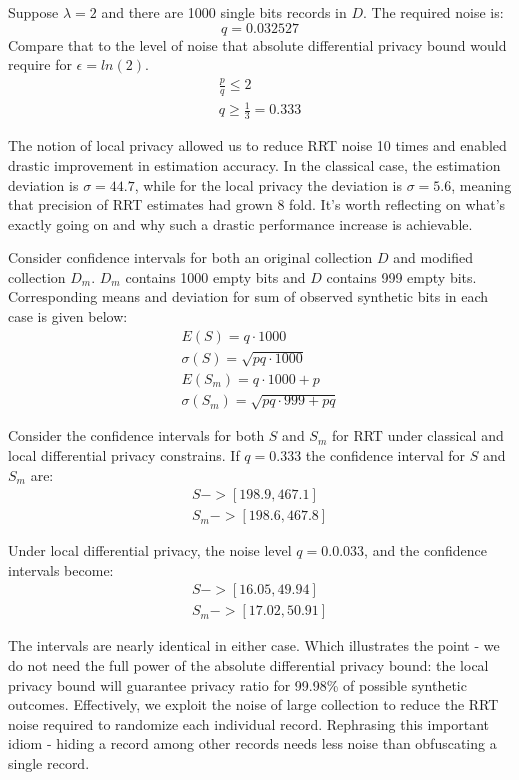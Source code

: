 \documentclass[11pt,draft]{article}
\begin{document}
Suppose  $\lambda=2$ and there are 1000 single bits records in $D$.  The required noise is:
\[
q = 0.032527
\]
Compare that to the level of noise that absolute differential privacy bound would require for $\epsilon=ln(2)$. 
\begin{align}
\frac{p}{q} \le 2 \\
q \ge \frac{1}{3} =  0.333
\end{align}

The notion of local privacy allowed us to reduce RRT noise 10 times and enabled drastic improvement in estimation accuracy.  In the classical case, the estimation deviation is $\sigma =  44.7$, while for the local privacy the deviation is $\sigma =  5.6$, meaning that precision of RRT estimates had grown 8 fold.  It's worth reflecting on what's  exactly going on and why such a drastic performance increase is achievable. 

Consider confidence intervals for both an original collection $D$  and modified collection $D_m$.  $D_m$ contains 1000 empty bits and $D$ contains 999 empty bits.  Corresponding means and deviation for sum of observed synthetic bits in each case is given below:
\begin{align}
E(S) = q \cdot 1000 \\
\sigma(S) = \sqrt{pq\cdot 1000} \\
E(S_m) = q \cdot 1000 + p  \\
\sigma(S_m) = \sqrt{pq\cdot 999 + pq}
\end{align}

Consider the confidence intervals for both $S$ and $S_m$ for RRT under classical and local differential privacy constrains.  If $q=0.333$ the confidence interval for $S$ and $S_m$  are:
\begin{align}
S -> [198.9 , 467.1] \\
S_m -> [198.6 , 467.8]
\end{align}

Under local differential privacy, the noise level $q= 0. 0.033$, and the confidence intervals become:
\begin{align}
S -> [16.05 , 49.94] \\
S_m -> [ 17.02 , 50.91]
\end{align}

The intervals are nearly identical in either case.  Which illustrates the point - we do not need the full power of the absolute differential privacy bound: the local privacy bound will guarantee privacy ratio for 99.98\% of possible synthetic outcomes.  Effectively, we exploit the noise of large collection to reduce the RRT noise required to randomize each individual record.  Rephrasing this important idiom - hiding a record among other records needs less noise than obfuscating a single record.
\end{document}

